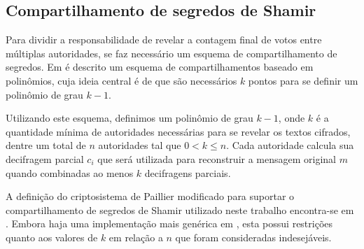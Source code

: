 \subsection{Compartilhamento de segredos de Shamir}

Para dividir a responsabilidade de revelar a contagem final de votos entre
múltiplas autoridades, se faz necessário um esquema de compartilhamento de
segredos. Em \textcite{Shamir:1979:SS:359168.359176} é descrito um esquema de
compartilhamentos baseado em polinômios, cuja ideia central é de que são
necessários $k$ pontos para se definir um polinômio de grau $k - 1$.

Utilizando este esquema, definimos um polinômio de grau $k - 1$, onde $k$ é a
quantidade mínima de autoridades necessárias para se revelar os textos
cifrados, dentre um total de $n$ autoridades tal que $0 < k \leq n$. Cada
autoridade calcula sua decifragem parcial $c_i$ que será utilizada para
reconstruir a mensagem original $m$ quando combinadas ao menos $k$ decifragens
parciais.

A definição do criptosistema de Paillier modificado para suportar o
compartilhamento de segredos de Shamir utilizado neste trabalho encontra-se em
\textcite{fouque2000sharing}. Embora haja uma implementação mais genérica em
\textcite{damgaard2010generalization}, esta possui restrições quanto aos
valores de $k$ em relação a $n$ que foram consideradas indesejáveis.
